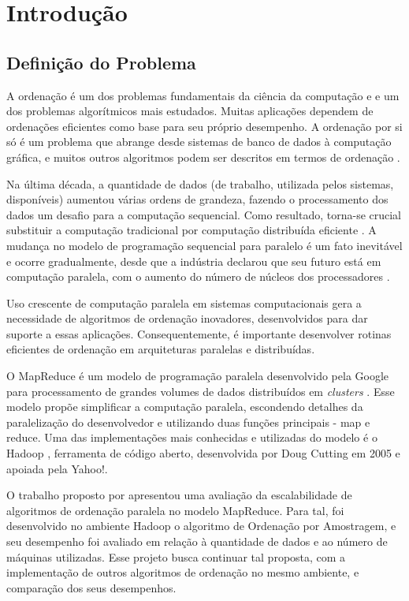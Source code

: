 \chapter{Introdução}
\label{cap:introducao}

\section{Definição do Problema}

A ordenação é um dos problemas fundamentais da ciência da computação e
e um dos problemas algorítmicos mais estudados. Muitas aplicações dependem de ordenações eficientes como base para seu próprio desempenho. A ordenação por si só é um problema que abrange desde sistemas de banco de dados à computação gráfica, e muitos outros algoritmos podem ser descritos em termos de ordenação  \cite{Satish:2009,Amato:1996}.  

Na última década, a quantidade de dados (de trabalho, utilizada pelos sistemas, disponíveis) aumentou várias ordens de grandeza, fazendo o processamento dos dados um desafio para a computação sequencial. Como resultado, torna-se crucial substituir a computação tradicional por computação distribuída eficiente \cite{lin:2010}. A mudança no modelo de programação sequencial para paralelo é um fato inevitável e ocorre gradualmente, desde que a indústria declarou que seu futuro está em computação paralela, com o aumento do número de núcleos dos processadores \cite{Asanovic:2009}. 

Uso crescente de computação paralela em sistemas computacionais gera a necessidade de algoritmos de ordenação inovadores, desenvolvidos para dar suporte a essas aplicações. Consequentemente, é importante desenvolver rotinas eficientes de ordenação em arquiteturas paralelas e distribuídas. 

O MapReduce é um modelo de programação paralela desenvolvido pela Google para processamento de grandes volumes de dados distribuídos em \textit{clusters} \cite{Dean:2008}. Esse modelo propõe simplificar a computação paralela, escondendo detalhes da paralelização do desenvolvedor e utilizando duas funções principais - map e reduce.
Uma das implementações mais conhecidas e utilizadas do modelo é o Hadoop \cite{Hadoop:2010}, ferramenta de código aberto, desenvolvida por Doug Cutting em 2005 e apoiada pela Yahoo!. 

O trabalho proposto por \cite{Paula:2011} apresentou uma avaliação da escalabilidade de algoritmos de ordenação paralela no modelo MapReduce. Para tal, foi desenvolvido no ambiente Hadoop o algoritmo de Ordenação por Amostragem, e seu desempenho foi avaliado em relação à quantidade de dados e ao número de máquinas utilizadas. 
Esse projeto busca continuar tal proposta, com a implementação de outros algoritmos de ordenação no mesmo ambiente, e comparação dos seus desempenhos.

